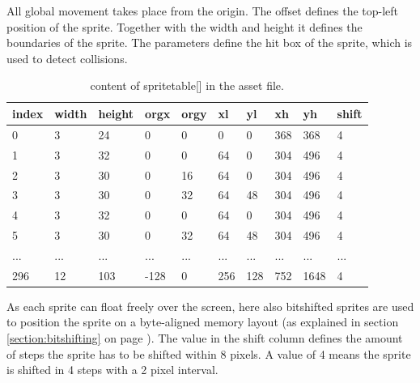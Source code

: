 \documentclass[book.tex]{subfiles}
\begin{document}
All global movement takes place from the origin. The offset  defines the top-left position of the sprite. Together with the width and height it defines the boundaries of the sprite. The parameters  define the hit box of the sprite, which is used to detect collisions.\\

\begin{table}[H]
  \begin{tabularx}{\textwidth}[c]{lXXXXXXXXX}
  \hline
  \textbf{index} & \textbf{width} & \textbf{height} & \textbf{orgx} & \textbf{orgy}
    & \textbf{xl} & \textbf{yl} & \textbf{xh} & \textbf{yh} & \textbf{shift} \\ \hline
  0  &   3  &   24  &   0  &   0  &   0  &   0  &   368  &   368  &   4 \\
  1  &   3  &   32  &   0  &   0  &   64  &   0  &   304  &   496  &   4 \\
  2  &   3  &   30  &   0  &   16  &   64  &   0  &   304  &   496  &   4 \\
  3  &   3  &   30  &   0  &   32  &   64  &   48  &   304  &   496  &   4 \\
  4  &   3  &   32  &   0  &   0  &   64  &   0  &   304  &   496  &   4 \\
  5  &   3  &   30  &   0  &   32  &   64  &   48  &   304  &   496  &   4 \\
 ...  &   ...  &   ...  &   ...  &   ...  &   ...  &   ...  &   ...  &   ...  &   ... \\
 296  &   12  &   103  &   -128  &   0  &   256  &   128  &   752  &   1648  &   4\\
  \end{tabularx}
  \caption{content of spritetable[] in the  asset file.}
  \label{table:spritetable}
\end{table}

As each sprite can float freely over the screen, here also bitshifted sprites are used to position the sprite on a byte-aligned memory layout (as explained in section \ref{section:bitshifting} on page \pageref{section:bitshifting}). The value in the shift column defines the amount of steps the sprite has to be shifted within 8 pixels. A value of 4 means the sprite is shifted in 4 steps with a 2 pixel interval.\\ 
\end{document}
